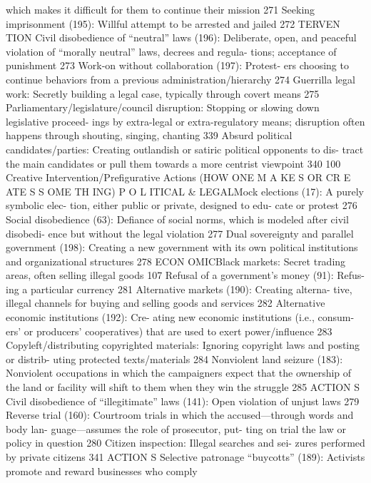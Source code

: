 \documentclass[twoside,a4paper,12pt,fleqn,openany]{extbook}
\begin{document}
which makes it difficult for them to continue
their mission
 271
Seeking imprisonment (195): Willful attempt
to be arrested and jailed
 272
TERVEN TION
Civil disobedience of “neutral” laws (196):
Deliberate, open, and peaceful violation of
“morally neutral” laws, decrees and regula-
tions; acceptance of punishment
 273
Work-on without collaboration (197): Protest-
ers choosing to continue behaviors from a
previous administration/hierarchy
 274
Guerrilla legal work: Secretly building a legal
case, typically through covert means
 275
Parliamentary/legislature/council disruption:
Stopping or slowing down legislative proceed-
ings by extra-legal or extra-regulatory means;
disruption often happens through shouting,
singing, chanting
 339
Absurd political candidates/parties: Creating
outlandish or satiric political opponents to dis-
tract the main candidates or pull them towards
a more centrist viewpoint
 340
100
Creative Intervention/Prefigurative Actions
(HOW ONE M A KE S OR CR E ATE S S OME TH ING)
P O L ITICAL & LEGALMock elections (17): A purely symbolic elec-
tion, either public or private, designed to edu-
cate or protest
 276
Social disobedience (63): Defiance of social
norms, which is modeled after civil disobedi-
ence but without the legal violation
 277
Dual sovereignty and parallel government
(198): Creating a new government with its
own political institutions and organizational
structures
 278
ECON OMICBlack markets: Secret trading areas, often
selling illegal goods
 107
Refusal of a government’s money (91): Refus-
ing a particular currency
 281
Alternative markets (190): Creating alterna-
tive, illegal channels for buying and selling
goods and services
 282
Alternative economic institutions (192): Cre-
ating new economic institutions (i.e., consum-
ers’ or producers’ cooperatives) that are used
to exert power/influence
 283
Copyleft/distributing copyrighted materials:
Ignoring copyright laws and posting or distrib-
uting protected texts/materials
 284
Nonviolent land seizure (183): Nonviolent
occupations in which the campaigners expect
that the ownership of the land or facility will
shift to them when they win the struggle 285
ACTION S
Civil disobedience of “illegitimate” laws (141):
Open violation of unjust laws
 279
Reverse trial (160): Courtroom trials in which
the accused—through words and body lan-
guage—assumes the role of prosecutor, put-
ting on trial the law or policy in question 280
Citizen inspection: Illegal searches and sei-
zures performed by private citizens
 341
ACTION S
Selective patronage “buycotts” (189): Activists
promote and reward businesses who comply
\end{document}
